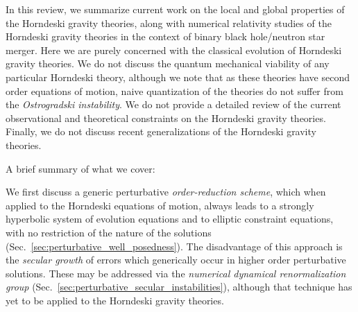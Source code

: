 \documentclass{ws-ijmpd}
\begin{document}
In this review, we summarize current work on the local and global
properties of the Horndeski gravity theories, along with numerical
relativity studies of the Horndeski gravity theories in the
context of binary black hole/neutron star merger.
Here we are purely concerned with the classical evolution
of Horndeski gravity theories.
We do not discuss
the quantum mechanical viability of any particular Horndeski theory,
although we note that as these theories have second order equations
of motion, naive quantization of the theories
do not suffer from the 
\emph{Ostrogradski instability}\cite{Woodard:2015zca,Kobayashi:2019hrl}.
We do not provide a detailed review of
the current observational and
theoretical constraints on the Horndeski gravity theories.
Finally, we do not discuss recent generalizations of the Horndeski
gravity theories\cite{Kobayashi:2019hrl}.

A brief summary of what we cover:

We first discuss a generic perturbative
\emph{order-reduction scheme}, which when applied to the Horndeski
equations of motion, always leads to a strongly hyperbolic system of
evolution equations and to elliptic constraint equations, with
no restriction of the nature of the solutions 
(Sec.~\ref{sec:perturbative_well_posedness}).
The disadvantage of this approach is the \emph{secular growth}
of errors which generically occur in higher order perturbative solutions.
These may be addressed via the 
\emph{numerical dynamical renormalization group}
(Sec.~\ref{sec:perturbative_secular_instabilities}), although
that technique has yet to be applied to the Horndeski gravity theories.
\end{document}
